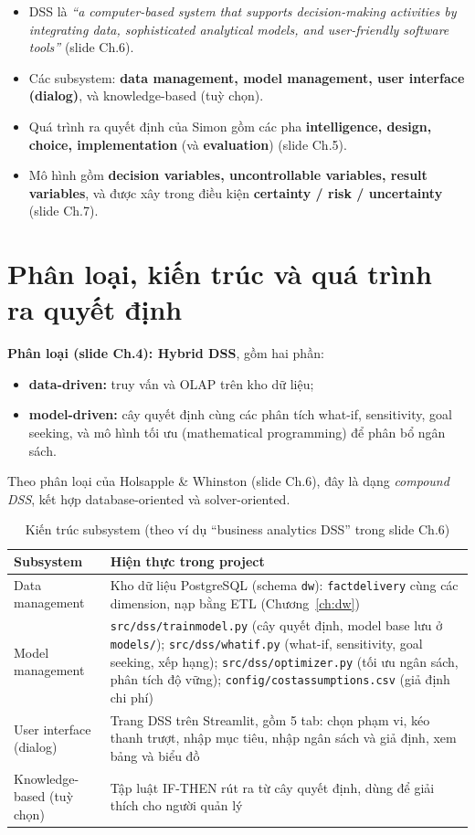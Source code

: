 \documentclass[12pt,a4paper]{report}
\newcommand{\code}[1]{\texttt{#1}}
\renewcommand{\_}{\oldunderscore\allowbreak}
\begin{document}
\begin{itemize}
\item DSS là \emph{``a computer-based system that supports decision-making activities by integrating data, sophisticated analytical models, and user-friendly software tools''} (slide Ch.6).
\item Các subsystem: \textbf{data management, model management, user interface (dialog)}, và knowledge-based (tuỳ chọn).
\item Quá trình ra quyết định của Simon gồm các pha \textbf{intelligence, design, choice, implementation} (và \textbf{evaluation}) (slide Ch.5).
\item Mô hình gồm \textbf{decision variables, uncontrollable variables, result variables}, và được xây trong điều kiện \textbf{certainty / risk / uncertainty} (slide Ch.7).
\end{itemize}

\section{Phân loại, kiến trúc và quá trình ra quyết định}\label{sec:dss-arch}

\textbf{Phân loại (slide Ch.4): Hybrid DSS}, gồm hai phần:
\begin{itemize}
\item \textbf{data-driven:} truy vấn và OLAP trên kho dữ liệu;
\item \textbf{model-driven:} cây quyết định cùng các phân tích what-if, sensitivity, goal seeking, và mô hình tối ưu (mathematical programming) để phân bổ ngân sách.
\end{itemize}
Theo phân loại của Holsapple \& Whinston (slide Ch.6), đây là dạng \emph{compound DSS}, kết hợp database-oriented và solver-oriented.

\begin{table}[H]
\centering\small
\caption{Kiến trúc subsystem (theo ví dụ ``business analytics DSS'' trong slide Ch.6)}
\begin{tabular}{L{3.4cm}L{11.2cm}}
\toprule
Subsystem & Hiện thực trong project \\
\midrule
Data management & Kho dữ liệu PostgreSQL (schema \code{dw}): \code{fact\_delivery} cùng các dimension, nạp bằng ETL (Chương~\ref{ch:dw}) \\
Model management & \code{src/dss/train\_model.py} (cây quyết định, model base lưu ở \code{models/}); \code{src/dss/whatif.py} (what-if, sensitivity, goal seeking, xếp hạng); \code{src/dss/optimizer.py} (tối ưu ngân sách, phân tích độ vững); \code{config/cost\_assumptions.csv} (giả định chi phí) \\
User interface (dialog) & Trang DSS trên Streamlit, gồm 5 tab: chọn phạm vi, kéo thanh trượt, nhập mục tiêu, nhập ngân sách và giả định, xem bảng và biểu đồ \\
Knowledge-based (tuỳ chọn) & Tập luật IF-THEN rút ra từ cây quyết định, dùng để giải thích cho người quản lý \\
\bottomrule
\end{tabular}
\end{table}
\end{document}
